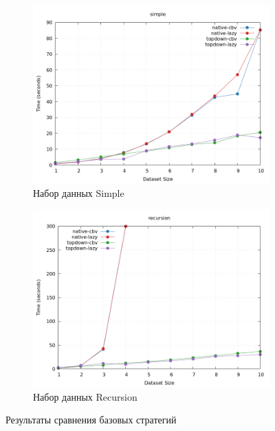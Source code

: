 \documentclass[../thesis.tex]{subfiles}
\begin{document}
\begin{figure}[h]
    \begin{subfigure}{0.5\textwidth}
    \includegraphics[width=\linewidth]{basic_simple.png} 
    \caption{Набор данных Simple}
    \end{subfigure}
    \begin{subfigure}{0.5\textwidth}
    \includegraphics[width=\linewidth]{basic_recursion.png}
    \caption{Набор данных Recursion}
    \end{subfigure}
    \caption{Результаты сравнения базовых стратегий}
    \label{plot_basic}
\end{figure}
\end{document}
